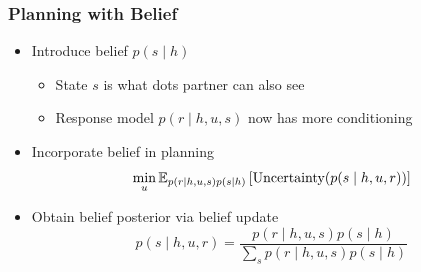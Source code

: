 \documentclass{beamer}
\begin{document}
\begin{frame}
\frametitle{Planning with Belief}
\begin{itemize}
\item Introduce belief $p(s \mid h)$
    \begin{itemize}
    \item State $s$ is what dots partner can also see
    \item Response model $p(r \mid h,u,s)$ now has more conditioning
    \end{itemize}
\begin{center}
\end{center}
\item Incorporate belief in planning
$$\min_{u} \mathbb{E}_{p(r \mid h, u, s)p(s \mid h)}\left[\text{Uncertainty}(p(s \mid h, u, r))\right]$$
\item Obtain belief posterior via belief update
$$p(s \mid h, u, r) = \frac{p(r \mid h, u, s)p(s \mid h)}{\sum_s p(r\mid h,u,s)p(s \mid h)}$$
\end{itemize}
\end{frame}
\end{document}
